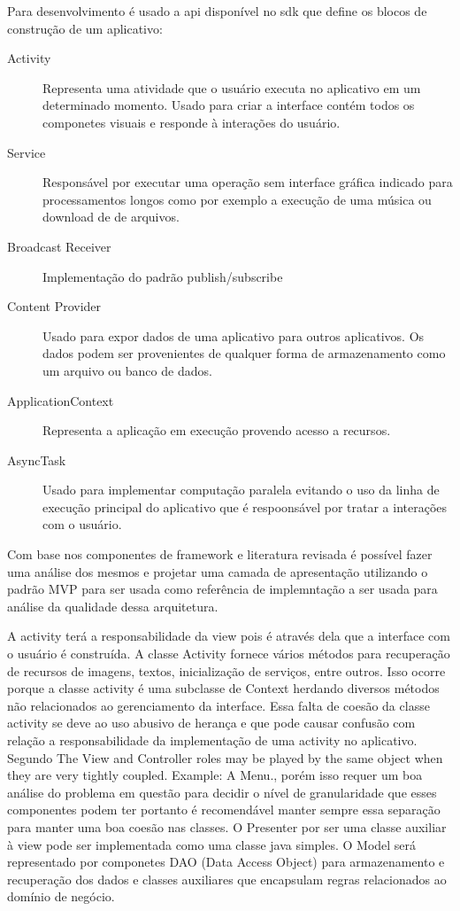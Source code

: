 Para desenvolvimento é usado a api disponível no sdk que define
os blocos de construção de um aplicativo:

\begin{description}
  \item[Activity] Representa uma atividade que o usuário executa no aplicativo
  em um determinado momento. Usado para criar a interface contém todos os
  componetes visuais e responde à interações do usuário.
  \item[Service] Responsável por executar uma operação sem interface gráfica
  indicado para processamentos longos como por exemplo a execução de uma música
  ou download de de arquivos.
  \item[Broadcast Receiver] Implementação do padrão publish/subscribe 
  \item[Content Provider] Usado para expor dados de uma aplicativo para outros
  aplicativos. Os dados podem ser provenientes de qualquer forma de
  armazenamento como um arquivo ou banco de dados.
  \item[ApplicationContext] Representa a aplicação em execução provendo acesso
  a recursos.
  \item[AsyncTask] Usado para implementar computação paralela evitando o uso da
  linha de execução principal do aplicativo que é respoonsável por tratar a
  interações com o usuário.
\end{description}


Com base nos componentes de framework e literatura revisada é possível fazer
uma análise dos mesmos e projetar uma camada de apresentação utilizando o padrão
MVP para ser usada como referência de implemntação a ser usada para análise da
qualidade dessa arquitetura.

A activity terá a responsabilidade da view pois é através dela que a interface
com o usuário é construída. A classe Activity fornece vários métodos para
recuperação de recursos de imagens, textos, inicialização de serviços, entre
outros. Isso ocorre porque a classe activity é uma subclasse de Context herdando
diversos métodos não relacionados ao gerenciamento da interface. Essa falta de
coesão da classe activity se deve ao uso abusivo de herança e que pode causar
confusão com relação a responsabilidade da implementação de uma activity no
aplicativo. Segundo  The View and Controller roles
may be played by the same object when they are very tightly coupled. Example: A
Menu., porém isso requer um boa análise do problema em questão para decidir o
nível de granularidade que esses componentes podem ter portanto é recomendável
manter sempre essa separação para manter uma boa coesão nas classes. O Presenter
por ser uma classe auxiliar à view pode ser implementada como uma classe java
simples. O Model será representado por componetes DAO (Data Access Object) para
armazenamento e recuperação dos dados e classes auxiliares que encapsulam
regras relacionados ao domínio de negócio.


